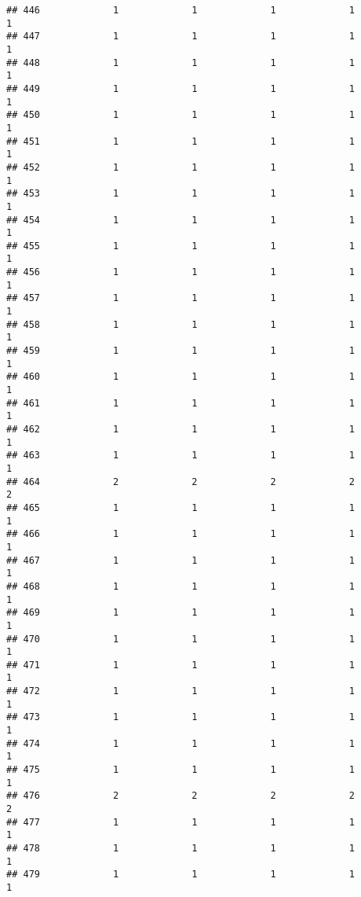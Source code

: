 \documentclass[
]{article}
\begin{document}
\begin{verbatim}
## 446             1             1             1             1             1
## 447             1             1             1             1             1
## 448             1             1             1             1             1
## 449             1             1             1             1             1
## 450             1             1             1             1             1
## 451             1             1             1             1             1
## 452             1             1             1             1             1
## 453             1             1             1             1             1
## 454             1             1             1             1             1
## 455             1             1             1             1             1
## 456             1             1             1             1             1
## 457             1             1             1             1             1
## 458             1             1             1             1             1
## 459             1             1             1             1             1
## 460             1             1             1             1             1
## 461             1             1             1             1             1
## 462             1             1             1             1             1
## 463             1             1             1             1             1
## 464             2             2             2             2             2
## 465             1             1             1             1             1
## 466             1             1             1             1             1
## 467             1             1             1             1             1
## 468             1             1             1             1             1
## 469             1             1             1             1             1
## 470             1             1             1             1             1
## 471             1             1             1             1             1
## 472             1             1             1             1             1
## 473             1             1             1             1             1
## 474             1             1             1             1             1
## 475             1             1             1             1             1
## 476             2             2             2             2             2
## 477             1             1             1             1             1
## 478             1             1             1             1             1
## 479             1             1             1             1             1

\end{verbatim}
\end{document}
